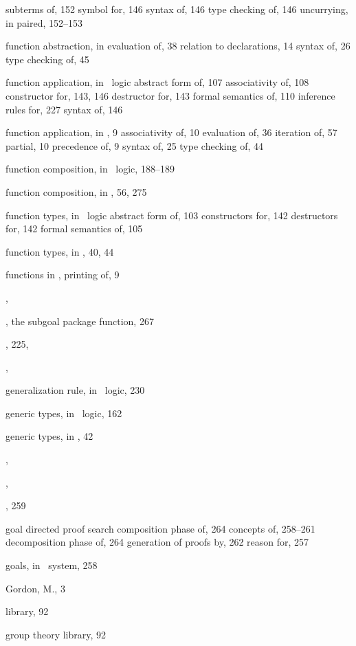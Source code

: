 \begin{theindex}
    \subitem subterms of, 152
    \subitem symbol for, 146
    \subitem syntax of, 146
    \subitem type checking of, 146
    \subitem uncurrying, in paired, 152--153
  \item function abstraction, in \ML
    \subitem evaluation of, 38
    \subitem relation to declarations, 14
    \subitem syntax of, 26
    \subitem type checking of, 45
  \item function application, in \HOL\ logic
    \subitem abstract form of, 107
    \subitem associativity of, 108
    \subitem constructor for, 143, 146
    \subitem destructor for, 143
    \subitem formal semantics of, 110
    \subitem inference rules for, 227
    \subitem syntax of, 146
  \item function application, in \ML, 9
    \subitem associativity of, 10
    \subitem evaluation of, 36
    \subitem iteration of, 57
    \subitem partial, 10
    \subitem precedence of, 9
    \subitem syntax of, 25
    \subitem type checking of, 44
  \item function composition, in \HOL\ logic, 188--189
  \item function composition, in \ML, 56, 275
  \item function types, in \HOL\ logic
    \subitem abstract form of, 103
    \subitem constructors for, 142
    \subitem destructors for, 142
    \subitem formal semantics of, 105
  \item function types, in \ML, 40, 44
  \item functions in \ML, printing of, 9
  \item {}, 

  \indexspace

  \item {}, the subgoal package function, 267
  \item {}, 225, 
  \item {}, 
  \item generalization rule, in \HOL\ logic, 230
  \item generic types, in \HOL\ logic, 162
  \item generic types, in \ML, 42
  \item {}, 
  \item {}, 
  \item {}, 259
  \item goal directed proof search
    \subitem composition phase of, 264
    \subitem concepts of, 258--261
    \subitem decomposition phase of, 264
    \subitem generation of proofs by, 262
    \subitem reason for, 257
  \item goals, in \HOL\ system, 258
  \item Gordon, M., 3
  \item {} library, 92
  \item group theory library, 92


\end{theindex}
